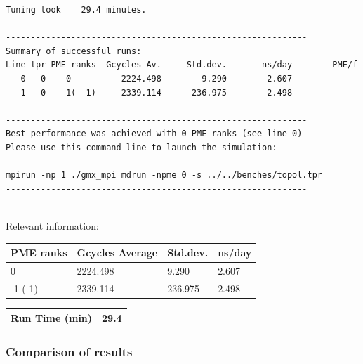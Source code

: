 \begin{lstlisting}[frame=single]
Tuning took    29.4 minutes.

------------------------------------------------------------
Summary of successful runs:
Line tpr PME ranks  Gcycles Av.     Std.dev.       ns/day        PME/f
   0   0    0          2224.498        9.290        2.607          -  
   1   0   -1( -1)     2339.114      236.975        2.498          -  

------------------------------------------------------------
Best performance was achieved with 0 PME ranks (see line 0)
Please use this command line to launch the simulation:

mpirun -np 1 ./gmx_mpi mdrun -npme 0 -s ../../benches/topol.tpr  
------------------------------------------------------------


\end{lstlisting}

Relevant information:
\begin{center}
    \begin{tabular}{|p{3.5cm}|p{3.5cm}|p{3.5cm}|p{3.5cm}|} \hline
         PME ranks & Gcycles Average & Std.dev. & ns/day \\ \hline
         0 & 2224.498  & 9.290  & 2.607  \\ \hline
         -1 (-1) & 2339.114 & 236.975 & 2.498  \\ \hline
    \end{tabular}
     \begin{tabular}{|p{3.5cm}|p{11.4cm}|} \hline
         Run Time (min) & 29.4 \\ \hline
    \end{tabular}
\end{center}
\subsubsection{Comparison of results}

